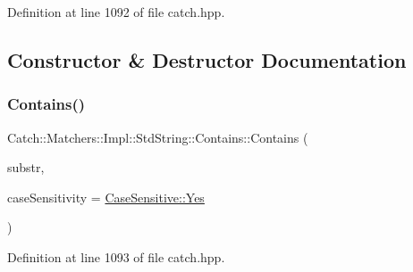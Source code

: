 Definition at line 1092 of file catch.\+hpp.



\subsection{Constructor \& Destructor Documentation}
\hypertarget{struct_catch_1_1_matchers_1_1_impl_1_1_std_string_1_1_contains_a7a062d83bd3e3075929dbb55e1c24258}{}\label{struct_catch_1_1_matchers_1_1_impl_1_1_std_string_1_1_contains_a7a062d83bd3e3075929dbb55e1c24258} 
\subsubsection{\texorpdfstring{Contains()}{Contains()}\hspace{0.1cm}{\footnotesize\ttfamily [1/2]}}
{\footnotesize\ttfamily Catch\+::\+Matchers\+::\+Impl\+::\+Std\+String\+::\+Contains\+::\+Contains (\begin{DoxyParamCaption}\item[{std\+::string const \&}]{substr,  }\item[{\hyperlink{struct_catch_1_1_case_sensitive_aad49d3aee2d97066642fffa919685c6a}{Case\+Sensitive\+::\+Choice}}]{case\+Sensitivity = {\ttfamily \hyperlink{struct_catch_1_1_case_sensitive_aad49d3aee2d97066642fffa919685c6aa7c5550b69ec3c502e6f609b67f9613c6}{Case\+Sensitive\+::\+Yes}} }\end{DoxyParamCaption})\hspace{0.3cm}{\ttfamily [inline]}}



Definition at line 1093 of file catch.\+hpp.

\hypertarget{struct_catch_1_1_matchers_1_1_impl_1_1_std_string_1_1_contains_ad6b1ef653dfcb3bab43c43be043dc4e8}{}\label{struct_catch_1_1_matchers_1_1_impl_1_1_std_string_1_1_contains_ad6b1ef653dfcb3bab43c43be043dc4e8} 
